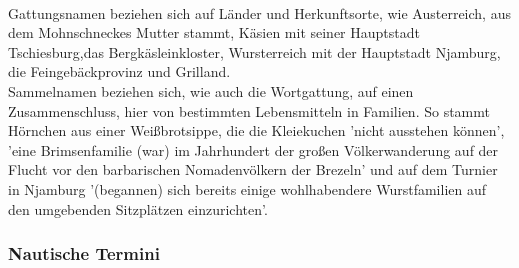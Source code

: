 {\\
Gattungsnamen beziehen sich auf Länder und Herkunftsorte, wie Austerreich, aus dem Mohnschneckes Mutter stammt, \cite[S.13]{pir} Käsien \cite[S.140ff]{pir} mit seiner Hauptstadt Tschiesburg,\cite[S.164ff]{pir}das Bergkäsleinkloster,\cite[S.164]{pir} Wursterreich \cite[S.285ff]{pir} mit der Hauptstadt Njamburg, \cite[S.289]{pir}  die Feingebäckprovinz und \cite[S.325]{pir} Grilland. \cite[S.635]{pir} 
\\
Sammelnamen beziehen sich, wie auch die Wortgattung, auf einen Zusammenschluss, hier von bestimmten Lebensmitteln in Familien. So stammt Hörnchen aus einer Weißbrotsippe,\cite[S.538]{pir} die die Kleiekuchen \cite[S.538]{pir} 'nicht ausstehen können',\cite[S.538]{pir} 'eine Brimsenfamilie (war) im Jahrhundert der großen Völkerwanderung auf der Flucht vor den barbarischen Nomadenvölkern der Brezeln'\cite[S.165]{pir} und auf dem Turnier in Njamburg \cite[S.343ff]{pir}'(begannen) sich bereits einige wohlhabendere Wurstfamilien auf den umgebenden Sitzplätzen einzurichten'.\cite[S.345]{pir}


\subsubsection{Nautische Termini}

}
